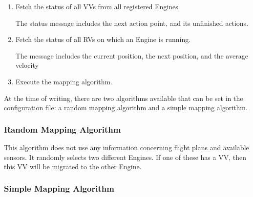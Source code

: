 \begin{enumerate}
  \item Fetch the status of all \acp{VV} from all registered Engines.
  
  The status message includes the next action point, and its unfinished actions.
  
  \item Fetch the status of all \acp{RV} on which an Engine is running.
  
  The message includes the current position, the next position, and the average velocity
  
  \item Execute the mapping algorithm.
\end{enumerate}

At the time of writing, there are two algorithms available that can be set in the configuration file: a random
mapping algorithm and a simple mapping algorithm.

\subsubsection{Random Mapping Algorithm}
This algorithm does not use any information concerning flight plans and available sensors.
It randomly selects two different Engines. If one of these has a \ac{VV}, then this \ac{VV} will be
migrated to the other Engine.

\subsubsection{Simple Mapping Algorithm}


